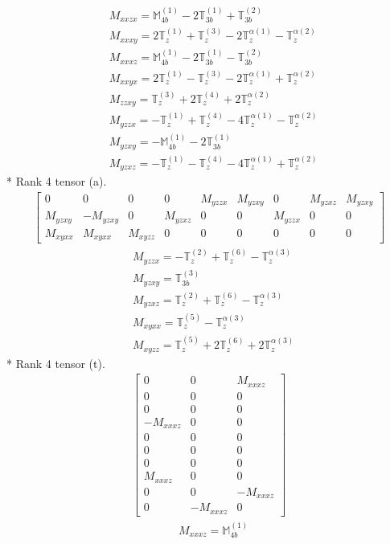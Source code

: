 \documentclass[fleqn,8pt,landscape]{jsarticle}
\begin{document}
\begin{align*}
& M_{xxzx} = \mathbb{M}_{4b}^{(1)} - 2 \mathbb{T}_{3b}^{(1)} + \mathbb{T}_{3b}^{(2)} \\
& M_{xxxy} = 2 \mathbb{T}_{z}^{(1)} + \mathbb{T}_{z}^{(3)} - 2 \mathbb{T}_{z}^{\alpha(1)} - \mathbb{T}_{z}^{\alpha(2)} \\
& M_{xxxz} = \mathbb{M}_{4b}^{(1)} - 2 \mathbb{T}_{3b}^{(1)} - \mathbb{T}_{3b}^{(2)} \\
& M_{xxyx} = 2 \mathbb{T}_{z}^{(1)} - \mathbb{T}_{z}^{(3)} - 2 \mathbb{T}_{z}^{\alpha(1)} + \mathbb{T}_{z}^{\alpha(2)} \\
& M_{zzxy} = \mathbb{T}_{z}^{(3)} + 2 \mathbb{T}_{z}^{(4)} + 2 \mathbb{T}_{z}^{\alpha(2)} \\
& M_{yzzx} = - \mathbb{T}_{z}^{(1)} + \mathbb{T}_{z}^{(4)} - 4 \mathbb{T}_{z}^{\alpha(1)} - \mathbb{T}_{z}^{\alpha(2)} \\
& M_{yzxy} = - \mathbb{M}_{4b}^{(1)} - 2 \mathbb{T}_{3b}^{(1)} \\
& M_{yzxz} = - \mathbb{T}_{z}^{(1)} - \mathbb{T}_{z}^{(4)} - 4 \mathbb{T}_{z}^{\alpha(1)} + \mathbb{T}_{z}^{\alpha(2)}
\end{align*}
* Rank 4 tensor (a).
\begin{align*}
\begin{bmatrix} 0 & 0 & 0 & 0 & M_{yzzx} & M_{yzxy} & 0 & M_{yzxz} & M_{yzxy} \\ M_{yzxy} & - M_{yzxy} & 0 & M_{yzxz} & 0 & 0 & M_{yzzx} & 0 & 0 \\ M_{xyxx} & M_{xyxx} & M_{xyzz} & 0 & 0 & 0 & 0 & 0 & 0 \end{bmatrix}
\end{align*}
\begin{align*}
& M_{yzzx} = - \mathbb{T}_{z}^{(2)} + \mathbb{T}_{z}^{(6)} - \mathbb{T}_{z}^{\alpha(3)} \\
& M_{yzxy} = \mathbb{T}_{3b}^{(3)} \\
& M_{yzxz} = \mathbb{T}_{z}^{(2)} + \mathbb{T}_{z}^{(6)} - \mathbb{T}_{z}^{\alpha(3)} \\
& M_{xyxx} = \mathbb{T}_{z}^{(5)} - \mathbb{T}_{z}^{\alpha(3)} \\
& M_{xyzz} = \mathbb{T}_{z}^{(5)} + 2 \mathbb{T}_{z}^{(6)} + 2 \mathbb{T}_{z}^{\alpha(3)}
\end{align*}
* Rank 4 tensor (t).
\begin{align*}
\begin{bmatrix} 0 & 0 & M_{xxxz} \\ 0 & 0 & 0 \\ 0 & 0 & 0 \\ - M_{xxxz} & 0 & 0 \\ 0 & 0 & 0 \\ 0 & 0 & 0 \\ 0 & 0 & 0 \\ M_{xxxz} & 0 & 0 \\ 0 & 0 & - M_{xxxz} \\ 0 & - M_{xxxz} & 0 \end{bmatrix}
\end{align*}
\begin{align*}
& M_{xxxz} = \mathbb{M}_{4b}^{(1)}
\end{align*}
\end{document}

